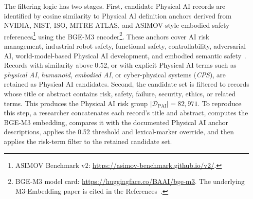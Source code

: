 \documentclass[11pt]{article}
\newcommand{\DPAI}{\mathcal{D}_{\mathrm{PAI}}}
\begin{document}
The filtering logic has two stages. First, candidate Physical AI records are identified by cosine similarity to Physical AI definition anchors derived from NVIDIA, NIST, ISO, MITRE ATLAS, and ASIMOV-style embodied safety references\footnote{ASIMOV Benchmark v2: \url{https://asimov-benchmark.github.io/v2/}.} using the BGE-M3 encoder\footnote{BGE-M3 model card: \url{https://huggingface.co/BAAI/bge-m3}. The underlying M3-Embedding paper is cited in the References~\cite{chen2024bgem3}.}. These anchors cover AI risk management, industrial robot safety, functional safety, controllability, adversarial AI, world-model-based Physical AI development, and embodied semantic safety~\cite{nist-airmf,iso23894,iso10218,iso5469,iso8200,mitre-atlas,nvidia-cosmos,sermanet-asimov,asimov2}. Records with similarity above 0.52, or with explicit Physical AI terms such as \textit{physical AI}, \textit{humanoid}, \textit{embodied AI}, or cyber-physical systems (\textit{CPS}), are retained as Physical AI candidates. Second, the candidate set is filtered to records whose title or abstract contains risk, safety, failure, security, ethics, or related terms. This produces the Physical AI risk group \(|\DPAI|=82,971\). To reproduce this step, a researcher concatenates each record's title and abstract, computes the BGE-M3 embedding, compares it with the documented Physical AI anchor descriptions, applies the 0.52 threshold and lexical-marker override, and then applies the risk-term filter to the retained candidate set.
\end{document}
